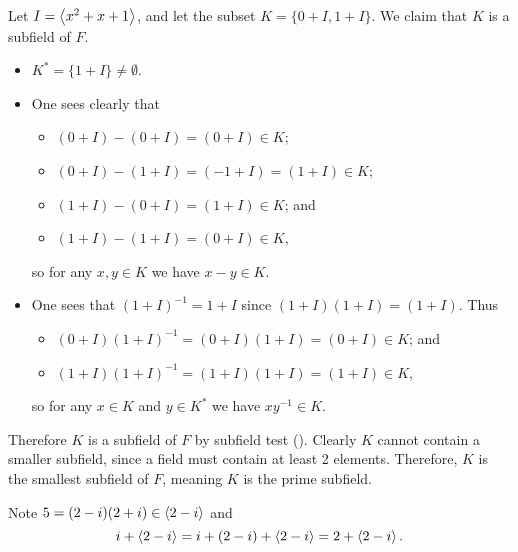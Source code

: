\begin{questions}
    Let $I = \left\langle x^2+x+1\right\rangle$, and let the subset $K = \{0 + I, 1 + I\}$. We claim that $K$ is a subfield of $F$.
    \begin{itemize}
        \item $K^\ast = \{1 + I\} \neq \emptyset$.
        \item One sees clearly that
        \begin{itemize}
            \item $(0 + I) - (0 + I) = (0 + I) \in K$;
            \item $(0 + I) - (1 + I) = (-1 + I) = (1 + I) \in K$;
            \item $(1 + I) - (0 + I) = (1 + I) \in K$; and
            \item $(1 + I) - (1 + I) = (0 + I) \in K$,
        \end{itemize}
        so for any $x, y \in K$ we have $x - y \in K$.
        \item One sees that $(1+I)^{-1} = 1+I$ since $(1+I)(1+I) = (1+I)$. Thus
        \begin{itemize}
            \item $(0+I)(1+I)^{-1} = (0+I)(1+I) = (0+I) \in K$; and
            \item $(1+I)(1+I)^{-1} = (1+I)(1+I) = (1+I) \in K$,
        \end{itemize}
        so for any $x \in K$ and $y \in K^\ast$ we have $xy^{-1} \in K$.
    \end{itemize}
    Therefore $K$ is a subfield of $F$ by subfield test (). Clearly $K$ cannot contain a smaller subfield, since a field must contain at least 2 elements. Therefore, $K$ is the smallest subfield of $F$, meaning $K$ is the prime subfield.

    \item \begin{partquestions}{\roman*}
        \item Note $5 = (2-i)(2+i) \in \left\langle2-i\right\rangle$ and
        \[
            i + \left\langle2-i\right\rangle = i + (2-i) + \left\langle2-i\right\rangle = 2 + \left\langle2-i\right\rangle.
        \]


\end{partquestions}
\end{questions}
